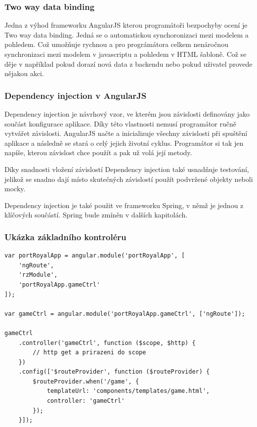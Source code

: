 \documentclass[czech,master,public,dept460,male,cpdeclaration,twoside]{diploma}
\begin{document}
\subsubsection{Two way data binding}
Jedna z výhod frameworku AngularJS kterou programátoři bezpochyby ocení je Two way data binding. Jedná se o automatickou synchoronizaci mezi modelem a pohledem. Což umožňuje rychnou a pro prográmátora celkem nenáročnou synchronizaci mezi modelem v javascriptu a pohledem v HTML šabloně. Což se děje v například pokud dorazí nová data z backendu nebo pokud uživatel provede nějakou akci. \cite{databinding}

\subsubsection{Dependency injection v AngularJS}
Dependency injection je návrhový vzor, ve kterém jsou závislosti definovány jako součást konfigurace aplikace. Díky této vlastnosti nemusí programátor ručně vytvářet závislosti. AngularJS načte a inicializuje všechny závislosti při spuštění aplikace a následně se stará o celý jejich životní cyklus. Programátor si tak jen napíše, kterou závislost chce použít a pak už volá její metody.

Díky snadnosti vložení závislostí Dependency injection také usnadňuje testování, jelikož se snadno dají místo skutečných závislostí použít podvržené objekty neboli mocky.

Dependency injection je také použit ve frameworku Spring, v němž je jednou z klíčových součástí. Spring bude zmíněn v dalších kapitolách. \cite{LearningAngularjs}

\subsubsection{Ukázka základního kontroléru}
\lstset{language=JavaScript}
\begin{lstlisting}[caption=Ukázka angulaří aplikace]
var portRoyalApp = angular.module('portRoyalApp', [
    'ngRoute',
    'rzModule',
    'portRoyalApp.gameCtrl'
]);

var gameCtrl = angular.module('portRoyalApp.gameCtrl', ['ngRoute']);

gameCtrl
    .controller('gameCtrl', function ($scope, $http) {
        // http get a prirazeni do scope
    })
    .config(['$routeProvider', function ($routeProvider) {
        $routeProvider.when('/game', {
            templateUrl: 'components/templates/game.html',
            controller: 'gameCtrl'
        });
    }]);
\end{lstlisting}
\end{document}
